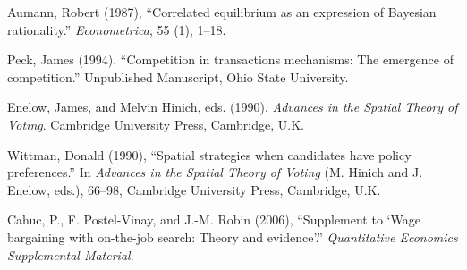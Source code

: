 \documentclass[qe,nameyear,draft]{econsocart}
\theoremstyle{plain}
\theoremstyle{remark}
\begin{document}



\begin{thebibliography}{}
%
Aumann, Robert (1987),
``Correlated equilibrium as an expression of Bayesian rationality.''
\textit{Econometrica}, 55 (1), 1--18.
\endbibitem

Peck, James (1994),
``Competition in transactions mechanisms: The emergence of competition.''
Unpublished Manuscript, Ohio State University.
\endbibitem

Enelow, James, and Melvin Hinich, eds. (1990),
\textit{Advances in the Spatial Theory of Voting}.
Cambridge University Press, Cambridge, U.K.
\endbibitem

Wittman, Donald (1990),
``Spatial strategies when candidates have policy preferences.''
In \textit{Advances in the Spatial Theory of Voting}
(M. Hinich and J. Enelow, eds.), 66--98,
Cambridge University Press, Cambridge, U.K.
\endbibitem

Cahuc, P., F. Postel-Vinay, and J.-M. Robin (2006), 
``Supplement to `Wage bargaining with on-the-job search: Theory and evidence'.''
\textit{Quantitative Economics Supplemental Material}.
\endbibitem
\end{thebibliography}
\end{document}
